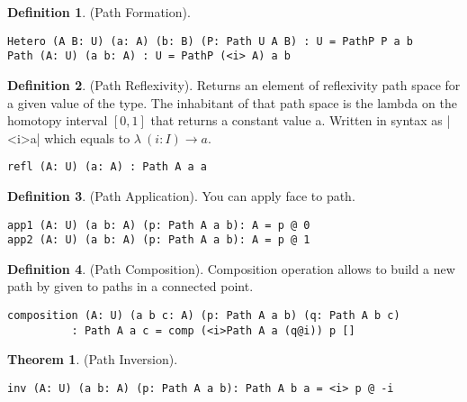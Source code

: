 \documentclass{article}
\theoremstyle{definition}
\newtheorem{theorem}{Theorem}
\newtheorem{definition}{Definition}
\begin{document}
\begin{definition} (Path Formation).
\begin{lstlisting}
Hetero (A B: U) (a: A) (b: B) (P: Path U A B) : U = PathP P a b
Path (A: U) (a b: A) : U = PathP (<i> A) a b
\end{lstlisting}
\end{definition}

\begin{definition} (Path Reflexivity).
Returns an element of reflexivity path space for a given value of the type.
The inhabitant of that path space is the lambda on the homotopy
interval $[0,1]$ that returns a constant value a. Written in
syntax as |<i>a| which equals to $\lambda\ (i: I) \rightarrow a$.
\begin{lstlisting}
refl (A: U) (a: A) : Path A a a
\end{lstlisting}
\end{definition}

\begin{definition} (Path Application).
You can apply face to path.
\begin{lstlisting}
app1 (A: U) (a b: A) (p: Path A a b): A = p @ 0
app2 (A: U) (a b: A) (p: Path A a b): A = p @ 1
\end{lstlisting}
\end{definition}

\begin{definition} (Path Composition).
Composition operation allows to build a new path by given to paths
in a connected point.
\begin{center}
\end{center}
\begin{lstlisting}
composition (A: U) (a b c: A) (p: Path A a b) (q: Path A b c)
          : Path A a c = comp (<i>Path A a (q@i)) p []
\end{lstlisting}
\end{definition}

\begin{theorem} (Path Inversion).
\begin{lstlisting}
inv (A: U) (a b: A) (p: Path A a b): Path A b a = <i> p @ -i
\end{lstlisting}
\end{theorem}
\end{document}
